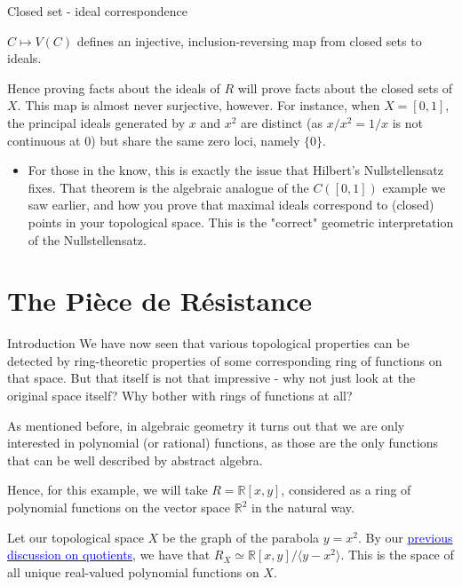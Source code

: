 \documentclass[aspectratio=169,10pt]{beamer}
\begin{document}
\begin{frame}{Closed set - ideal correspondence}
        \begin{theorem}
        $C \mapsto V(C)$ defines an injective, inclusion-reversing map from closed sets to ideals.
    \end{theorem}
    Hence proving facts about the ideals of $R$ will prove facts about the closed sets of $X$. This map is almost never surjective, however. For instance, when $X = [0,1]$, the principal ideals generated by $x$ and $x^2$ are distinct (as $x/x^2 = 1/x$ is not continuous at $0$) but share the same zero loci, namely $\{0\}$.

    \begin{itemize}
        \item For those in the know, this is exactly the issue that Hilbert's Nullstellensatz fixes. That theorem is the algebraic analogue of the $C([0,1])$ example we saw earlier, and how you prove that maximal ideals correspond to (closed) points in your topological space. This is the "correct" geometric interpretation of the Nullstellensatz.
    \end{itemize}
\end{frame}


\section{The Pièce de Résistance}
\begin{frame}{Introduction}
    We have now seen that various topological properties can be detected by ring-theoretic properties of some corresponding ring of functions on that space. But that itself is not that impressive - why not just look at the original space itself? Why bother with rings of functions at all?
    \vspace{12pt}
    
    \pause As mentioned before, in algebraic geometry it turns out that we are only interested in polynomial (or rational) functions, as those are the only functions that can be well described by abstract algebra.
    \vspace{12pt}

    \pause Hence, for this example, we will take $R = \mathbb{R}[x,y]$, considered as a ring of polynomial functions on the vector space $\mathbb{R}^2$ in the natural way.

    Let our topological space $X$ be the graph of the parabola $y=x^2$.
    By our \hyperlink{Quotients}{\textcolor{blue}{previous discussion on quotients}}, we have that $R_X \simeq \mathbb{R}[x,y]/\langle y-x^2\rangle$. This is the space of all unique real-valued polynomial functions on $X$.
\end{frame}
\end{document}
